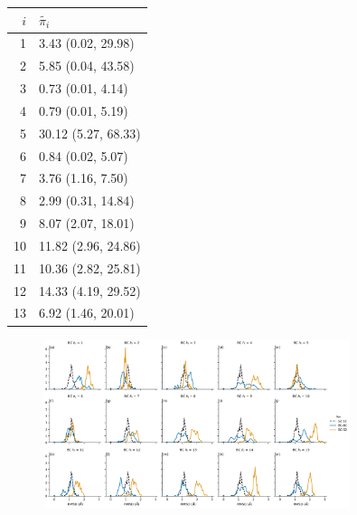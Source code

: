 \begin{table}
 \centering
 \label{tab:sens_2_stat_dist}
 \begin{tabular}{rl}
 \toprule
 $i$ & $\tilde{\pi_{i}}$ \\
 \midrule
 1 & 3.43 (0.02, 29.98) \\
 2 & 5.85 (0.04, 43.58) \\
 3 & 0.73 (0.01, 4.14) \\
 4 & 0.79 (0.01, 5.19) \\
 5 & 30.12 (5.27, 68.33) \\
 6 & 0.84 (0.02, 5.07) \\
 7 & 3.76 (1.16, 7.50) \\
 8 & 2.99 (0.31, 14.84) \\
 9 & 8.07 (2.07, 18.01) \\
 10 & 11.82 (2.96, 24.86) \\
 11 & 10.36 (2.82, 25.81) \\
 12 & 14.33 (4.19, 29.52) \\
 13 & 6.92 (1.46, 20.01) \\
 \bottomrule
 \end{tabular}
\end{table}

\begin{figure}
 \centering
 \label{fig:sens_2_overlap}
 \includegraphics[width=0.8\textwidth]{chapters/aadh/figures/sensitivity_2_5_overlap.png}

\end{figure}





